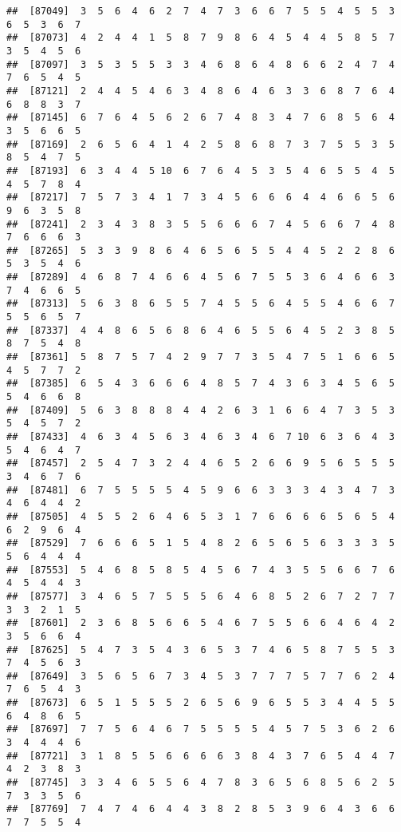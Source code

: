\documentclass[
]{book}
\begin{document}
\begin{verbatim}
##  [87049]  3  5  6  4  6  2  7  4  7  3  6  6  7  5  5  4  5  5  3  6  5  3  6  7
##  [87073]  4  2  4  4  1  5  8  7  9  8  6  4  5  4  4  5  8  5  7  3  5  4  5  6
##  [87097]  3  5  3  5  5  3  3  4  6  8  6  4  8  6  6  2  4  7  4  7  6  5  4  5
##  [87121]  2  4  4  5  4  6  3  4  8  6  4  6  3  3  6  8  7  6  4  6  8  8  3  7
##  [87145]  6  7  6  4  5  6  2  6  7  4  8  3  4  7  6  8  5  6  4  3  5  6  6  5
##  [87169]  2  6  5  6  4  1  4  2  5  8  6  8  7  3  7  5  5  3  5  8  5  4  7  5
##  [87193]  6  3  4  4  5 10  6  7  6  4  5  3  5  4  6  5  5  4  5  4  5  7  8  4
##  [87217]  7  5  7  3  4  1  7  3  4  5  6  6  6  4  4  6  6  5  6  9  6  3  5  8
##  [87241]  2  3  4  3  8  3  5  5  6  6  6  7  4  5  6  6  7  4  8  7  6  6  6  3
##  [87265]  5  3  3  9  8  6  4  6  5  6  5  5  4  4  5  2  2  8  6  5  3  5  4  6
##  [87289]  4  6  8  7  4  6  6  4  5  6  7  5  5  3  6  4  6  6  3  7  4  6  6  5
##  [87313]  5  6  3  8  6  5  5  7  4  5  5  6  4  5  5  4  6  6  7  5  5  6  5  7
##  [87337]  4  4  8  6  5  6  8  6  4  6  5  5  6  4  5  2  3  8  5  8  7  5  4  8
##  [87361]  5  8  7  5  7  4  2  9  7  7  3  5  4  7  5  1  6  6  5  4  5  7  7  2
##  [87385]  6  5  4  3  6  6  6  4  8  5  7  4  3  6  3  4  5  6  5  5  4  6  6  8
##  [87409]  5  6  3  8  8  8  4  4  2  6  3  1  6  6  4  7  3  5  3  5  4  5  7  2
##  [87433]  4  6  3  4  5  6  3  4  6  3  4  6  7 10  6  3  6  4  3  5  4  6  4  7
##  [87457]  2  5  4  7  3  2  4  4  6  5  2  6  6  9  5  6  5  5  5  3  4  6  7  6
##  [87481]  6  7  5  5  5  5  4  5  9  6  6  3  3  3  4  3  4  7  3  4  6  4  4  2
##  [87505]  4  5  5  2  6  4  6  5  3  1  7  6  6  6  6  5  6  5  4  6  2  9  6  4
##  [87529]  7  6  6  6  5  1  5  4  8  2  6  5  6  5  6  3  3  3  5  5  6  4  4  4
##  [87553]  5  4  6  8  5  8  5  4  5  6  7  4  3  5  5  6  6  7  6  4  5  4  4  3
##  [87577]  3  4  6  5  7  5  5  5  6  4  6  8  5  2  6  7  2  7  7  3  3  2  1  5
##  [87601]  2  3  6  8  5  6  6  5  4  6  7  5  5  6  6  4  6  4  2  3  5  6  6  4
##  [87625]  5  4  7  3  5  4  3  6  5  3  7  4  6  5  8  7  5  5  3  7  4  5  6  3
##  [87649]  3  5  6  5  6  7  3  4  5  3  7  7  7  5  7  7  6  2  4  7  6  5  4  3
##  [87673]  6  5  1  5  5  5  2  6  5  6  9  6  5  5  3  4  4  5  5  6  4  8  6  5
##  [87697]  7  7  5  6  4  6  7  5  5  5  5  4  5  7  5  3  6  2  6  3  4  4  4  6
##  [87721]  3  1  8  5  5  6  6  6  6  3  8  4  3  7  6  5  4  4  7  4  2  3  8  3
##  [87745]  3  3  4  6  5  5  6  4  7  8  3  6  5  6  8  5  6  2  5  7  3  3  5  6
##  [87769]  7  4  7  4  6  4  4  3  8  2  8  5  3  9  6  4  3  6  6  7  7  5  5  4

\end{verbatim}
\end{document}
